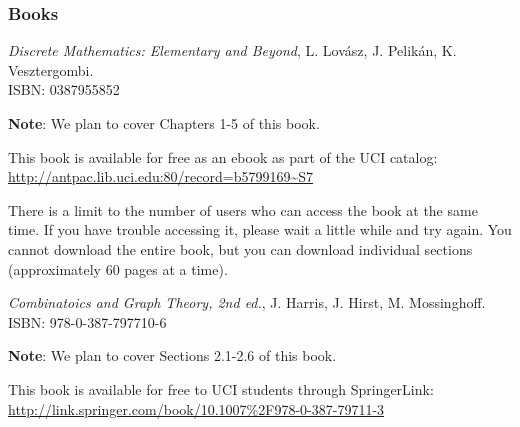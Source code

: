 \documentclass[11pt]{article}
\begin{document}
\subsubsection*{Books}
\begin{enumerate}
{\small
\item \emph{Discrete Mathematics: Elementary and Beyond}, L. Lov\'asz, J. Pelik\'an, K. Vesztergombi. \\
ISBN: 0387955852

{\bf Note}: We plan to cover Chapters 1-5 of this book.

This book is available for free as an ebook as part of the UCI catalog: \\
\url{http://antpac.lib.uci.edu:80/record=b5799169~S7}

There is a limit to the number of users who can access the book at the same time.  If you have trouble accessing it, please wait a little while and try again.  You cannot download the entire book, but you can download individual sections (approximately 60 pages at a time).


\item \emph{Combinatoics and Graph Theory, 2nd ed.}, J. Harris, J. Hirst, M. Mossinghoff. \\ ISBN: 978-0-387-797710-6

{\bf Note}: We plan to cover Sections 2.1-2.6 of this book. 

This book is available for free to UCI students through SpringerLink:\\
\url{http://link.springer.com/book/10.1007%2F978-0-387-79711-3}
}



\end{enumerate}
\end{document}
